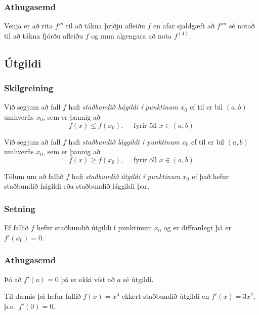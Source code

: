 \documentclass[icelandic,a4paper,12pt]{article}
\begin{document}
\subsubsection{Athugasemd}
Venja er að rita $f'''$ til að tákna þriðju afleiðu $f$ en afar sjaldgæft
að $f''''$ sé notað til að tákna fjórðu afleiðu $f$ og mun algengara
að nota $f^{(4)}$.  

\subsection{Útgildi}
 \subsubsection{Skilgreining}
 Við segjum að fall $f$ hafi \emph{staðbundið hágildi í punktinum} $x_0$
 ef til er bil $(a,b)$ umhverfis $x_0$, sem er þannig að 
 \begin{equation*}
	f(x) \leq f(x_0), \quad \text{ fyrir öll } x \in (a,b)
 \end{equation*}
 
 \pause
 
 Við segjum að fall $f$ hafi \emph{staðbundið lággildi í punktinum} $x_0$
 ef til er bil $(a,b)$ umhverfis $x_0$, sem er þannig að 
 \begin{equation*}
	f(x) \geq f(x_0), \quad \text{ fyrir öll } x \in (a,b)
 \end{equation*}
 
 \pause
 
 Tölum um að fallið $f$ hafi \emph{staðbundið útgildi í punktinum} $x_0$
 ef það hefur staðbundið hágildi eða staðbundið lággildi þar.
 
\subsubsection{Setning}\label{setn:diffutgildi}
Ef fallið $f$ hefur staðbundið útgildi í punktinum $x_0$ \pause
og er diffranlegt þá er $f'(x_0)=0$.

\subsubsection{Athugasemd}
Þó að $f'(a)=0$ þá er ekki víst að $a$ sé útgildi.

Til dæmis þá hefur fallið $f(x) = x^3$ ekkert staðbundið útgildi
en $f'(x) = 3x^2$, þ.e.~$f'(0) = 0$.
 
\end{document}
